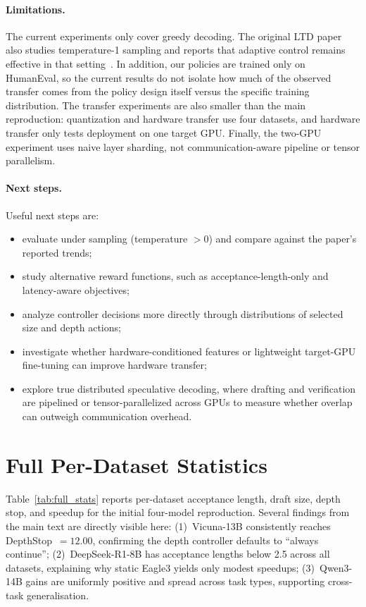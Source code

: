 \documentclass[letterpaper,twocolumn,10pt]{article}
\newenvironment{denseitemize}{
\begin{itemize}[topsep=2.5pt, partopsep=0pt, leftmargin=1.5em]
  \setlength{\itemsep}{2.5pt}
  \setlength{\parskip}{0pt}
  \setlength{\parsep}{0pt}
}{\end{itemize}}
\begin{document}
\paragraph{Limitations.}
The current experiments only cover greedy decoding. The original LTD paper also studies temperature-1 sampling and reports that adaptive control remains effective in that setting~\cite{ltd2025}. In addition, our policies are trained only on HumanEval, so the current results do not isolate how much of the observed transfer comes from the policy design itself versus the specific training distribution. The transfer experiments are also smaller than the main reproduction: quantization and hardware transfer use four datasets, and hardware transfer only tests deployment on one target GPU. Finally, the two-GPU experiment uses naive layer sharding, not communication-aware pipeline or tensor parallelism.

\paragraph{Next steps.}
Useful next steps are:
\begin{denseitemize}
  \item evaluate under sampling (temperature $> 0$) and compare against the paper's reported trends;
  \item study alternative reward functions, such as acceptance-length-only and latency-aware objectives;
  \item analyze controller decisions more directly through distributions of selected size and depth actions;
  \item investigate whether hardware-conditioned features or lightweight target-GPU fine-tuning can improve hardware transfer;
  \item explore true distributed speculative decoding, where drafting and verification are pipelined or tensor-parallelized across GPUs to measure whether overlap can outweigh communication overhead.
\end{denseitemize}




\appendix

\section{Full Per-Dataset Statistics}
\label{app:full_stats}

Table~\ref{tab:full_stats} reports per-dataset acceptance length, draft size, depth stop, and speedup for the initial four-model reproduction. Several findings from the main text are directly visible here: (1)~Vicuna-13B consistently reaches DepthStop~$= 12.00$, confirming the depth controller defaults to ``always continue''; (2)~DeepSeek-R1-8B has acceptance lengths below 2.5 across all datasets, explaining why static Eagle3 yields only modest speedups; (3)~Qwen3-14B gains are uniformly positive and spread across task types, supporting cross-task generalisation.
\end{document}
